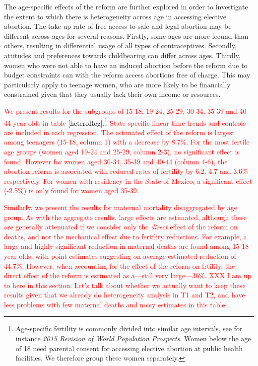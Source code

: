 \documentclass[a4paper, 11pt]{article}
\begin{document}
\begin{spacing}{2}
The age-specific effects of the reform are further explored in order to investigate the extent to which there is heterogeneity across age in accessing elective abortion.  The take-up rate of free access to safe and legal abortion may be different across ages for several reasons. Firstly, some ages are more fecund than others, resulting in differential usage of all types of contraceptives. Secondly, attitudes and preferences towards childbearing can differ across ages.  Thirdly, women who were not able to have an induced abortion before the reform due to budget constraints can with the reform access abortions free of charge. This may particularly apply to teenage women, who are more likely to be financially constrained given that they usually lack their own income or resources.

\textcolor{red}{We present results for the subgroups of 15-18, 19-24, 25-29, 30-34, 35-39 and 40-44 year-olds in table \ref{heteroReg}.\footnote{Age-specific fertility is commonly divided into similar age intervals, see for instance \textit{2015 Revision of World Population Prospects}. Women below the age of 18 need parental consent for accessing elective abortion at public health facilities. We therefore group these women separately.} State specific linear time trends and controls are included in each regression.  The estimated effect of the reform is largest among teenagers (15-18, column 1) with a decrease by 8.7\%. For the most fertile age groups (women aged 19-24 and 25-29, column 2-3), no significant effect is found. However for women aged 30-34, 35-39 and 40-44 (column 4-6), the abortion reform is associated with reduced rates of fertility by 6.2, 4.7 and 3.6\% respectively. For women with residency in the State of Mexico, a significant effect (-2.5\%) is only found for women aged 35-39.}

\textcolor{red}{Similarly, we present the results for maternal mortality disaggregated by age group.  As with the aggregate results, large effects are estimated, although these are generally attenuated if we consider only the \emph{direct} effect of the reform on deaths, and not the mechanical effect due to fertility reductions.  For example, a large and highly significant reduction in maternal deaths are found among 15-18 year olds, with point estimates suggesting on average estimated reduction of 44.7\%.  However, when accounting for the effect of the reform on frtility, the direct effect of the reform is estimated as a---still very large---36\%.  XXX I am up to here in this section.  Let's talk about whether we actually want to keep these results given that we already do heterogeneity analysis in T1 and T2, and have less problems with few maternal deaths and noisy estimates in this table...}


\end{spacing}
\end{document}
